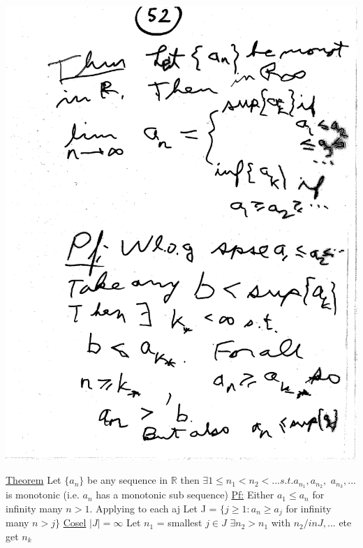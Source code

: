 \documentclass[10pt,a4paper]{article}
\begin{document}
{{\includegraphics[scale=.5]{Pages/SL_9} 

\newpage

\underline{Theorem} Let $\{a_n\}$ be any sequence in $\mathbb{R}$ then $\exists 1 \leq n_1 < n_2 < ... s.t. a_{n_{1}}, a_{n_{2}},$ $a_{n_{3}}, ...$ is monotonic (i.e. $a_n$ has a monotonic sub sequence)\newline
\underline{Pf:} Either $a_1 \leq a_n$ for infinity many $n > 1$. Applying to each aj
Let J = $\{j\geq 1 : a_n \geq a_j$ for infinity many $n > j\}$
\underline{Cosel} $|J| = \infty $
Let $n_1$ = smallest $ j \in J$ $\exists n_2 > n_1$ with $n_2 /in J, ...$ ete get $ {n_k}$

}}
\end{document}
